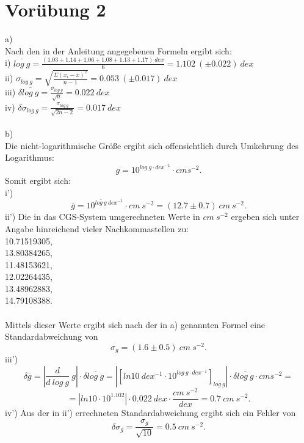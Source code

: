 \documentclass[titlepage]{scrartcl}
\begin{document}
\section{Vorübung 2}
a) \\
Nach den in der Anleitung angegebenen Formeln ergibt sich: \\
i) $ \bar{log\ g} = \frac{(1.03 + 1.14 + 1.06 + 1.08 + 1.13 + 1.17) \ dex }{6} = 1.102\ (\pm 0.022) \ dex $  \\
ii) $\sigma_{log\ g} = \sqrt{\frac{\Sigma(x_i - \bar{x})^2}{n-1}} = 0.053\ (\pm 0.017) \ dex $ \\
iii) $\delta \bar{log\ g} = \frac{\sigma_{log\ g}}{\sqrt{n}}  = 0.022 \ dex $ \\
iv)  $ \delta \sigma_{log\ g} = \frac{\sigma_{log\ g}}{\sqrt{2n-2}} = 0.017 \ dex $ \\ \\
b) \\
Die nicht-logarithmische Größe ergibt sich offensichtlich durch Umkehrung des Logarithmus: 
\begin{equation}
g = 10^{log\ g\cdot dex^{-1}} \cdot cm s ^{-2}.
\nonumber
\end{equation} 
Somit ergibt sich: \\
i') 
\begin{equation}
 \bar{g} = 10^{\bar{log\ g} \ dex^{-1}} \cdot cm\ s^{-2} = (12.7 \pm 0.7)\ cm\ s^{-2}. 
 \nonumber
\end{equation}
ii') Die in das CGS-System umgerechneten Werte in $cm\ s^{-2} $ ergeben sich unter Angabe hinreichend vieler Nachkommastellen zu: \\
10.71519305, \\
13.80384265, \\
11.48153621, \\
12.02264435, \\
13.48962883, \\
14.79108388. \\ \\
Mittels dieser Werte ergibt sich nach der in a) genannten Formel eine Standardabweichung von 
\begin{equation}
\sigma_{g} = (1.6 \pm 0.5)\ cm\ s^{-2}.
\nonumber
\end{equation}
iii') 
\begin{equation}
\delta \bar{g} = |\frac{d}{d\ log\ g}\ g| \cdot \delta \bar{log\ g} = |[ln{10}\ dex^{-1} \cdot 10^{log\ g\cdot dex^{-1}}]_{\bar{log\ g}}| \cdot \delta \bar{log\ g}\cdot cm s ^{-2} =
\nonumber 
\end{equation}
\begin{equation}
= |ln{10} \cdot 10^{1.102}| \cdot 0.022 \ dex \cdot \frac{cm\ s^{-2}}{dex}  = 0.7\  cm\ s^{-2}.
\nonumber
\end{equation}
iv') Aus der in ii') errechneten Standardabweichung ergibt sich ein Fehler von 
\begin{equation}
\delta \sigma_{g} = \frac{\sigma_{g}}{\sqrt{10}} = 0.5 \ cm\ s^{-2}. 
\nonumber
\end{equation}
\end{document}
